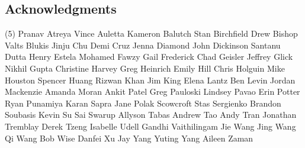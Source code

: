 \subsection{Acknowledgments}
\begingroup
\footnotesize
\begin{tasks}[label=\relax, label-width=0pt, item-indent=4pt](5)
\task Pranav Atreya
\task Vince Auletta
\task Kameron Balutch
\task Stan Birchfield
\task Drew Bishop
\task Valts Blukis
\task Jinju Chu
\task Demi Cruz
\task Jenna Diamond
\task John Dickinson
\task Santanu Dutta
\task Henry Estela
\task Mohamed Fawzy
\task Gail Frederick
\task Chad Geisler
\task Jeffrey Glick
\task Nikhil Gupta
\task Christine Harvey
\task Greg Heinrich
\task Emily Hill
\task Chris Holguin
\task Mike Houston
\task Spencer Huang
\task Rizwan Khan
\task Jim King
\task Elena Lantz
\task Ben Levin
\task Jordan Mackenzie
\task Amanda Moran
\task Ankit Patel
\task Greg Pauloski
\task Lindsey Pavao
\task Erin Potter
\task Ryan Punamiya 
\task Karan Sapra 
\task Jane Polak Scowcroft
\task Stas Sergienko
\task Brandon Soubasis
\task Kevin Su
\task Sai Swarup
\task Allyson Tabas
\task Andrew Tao 
\task Andy Tran
\task Jonathan Tremblay
\task Derek Tzeng
\task Isabelle Udell
\task Gandhi Vaithilingam
\task Jie Wang
\task Jing Wang
\task Qi Wang
\task Bob Wise
\task Danfei Xu 
\task Jay Yang
\task Yuting Yang
\task Aileen Zaman
\end{tasks}
\endgroup
